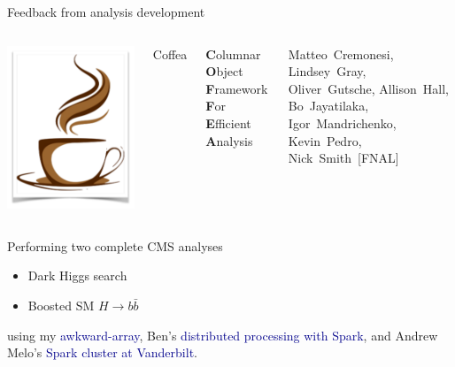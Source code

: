 \documentclass[aspectratio=169]{beamer}
\begin{document}
\begin{frame}{Feedback from analysis development}
\vspace{0.5 cm}
\begin{columns}
\includegraphics[width=\linewidth]{coffea-logo.png}

\hspace{-0.2 cm}\Huge Coffea

\vspace{0.25 cm}
\large {\bf C}olumnar {\bf O}bject {\bf F}ramework {\bf F}or {\bf E}fficient {\bf A}nalysis

\vspace{0.25 cm}
\normalsize Matteo~Cremonesi, Lindsey~Gray, Oliver~Gutsche, Allison~Hall, Bo~Jayatilaka, Igor~Mandrichenko, Kevin~Pedro, Nick~Smith~[FNAL]
\end{columns}

\begin{center}
\begin{minipage}{0.8\linewidth}
\large Performing two complete CMS analyses
\begin{itemize}
\item Dark Higgs search
\item Boosted SM $H \to b\bar{b}$
\end{itemize}
using my \textcolor{darkblue}{awkward-array}, Ben's \textcolor{darkblue}{distributed processing with Spark}, and Andrew Melo's \textcolor{darkblue}{Spark cluster at Vanderbilt}.
\end{minipage}
\end{center}
\end{frame}
\end{document}
